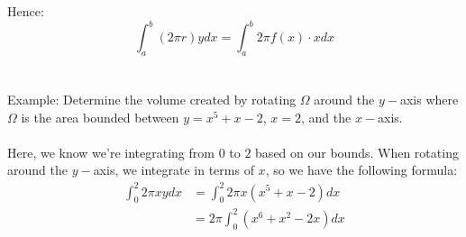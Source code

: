 \documentclass{article}
\begin{document}
\begin{enumerate}
    Hence:
    $$\int_a^b (2\pi r)y dx = \int_a^b 2\pi f(x) \cdot x dx$$\\
    \\
    Example: Determine the volume created by rotating $\Omega$ around the $y-$axis where $\Omega$ is the area bounded between $y=x^5 + x -2$, $x = 2$, and the $x-$axis.\\
    \\
    Here, we know we're integrating from $0$ to $2$ based on our bounds. When rotating around the $y-$axis, we integrate in terms of $x$, so we have the following formula:
    \begin{align*}
        \int_0^2 2\pi x y dx & = \int_0^2 2\pi x(x^5 + x - 2) dx\\
        & = 2\pi \int_0^2(x^6 + x^2 - 2x)dx
    \end{align*}
\end{enumerate}
\end{document}
